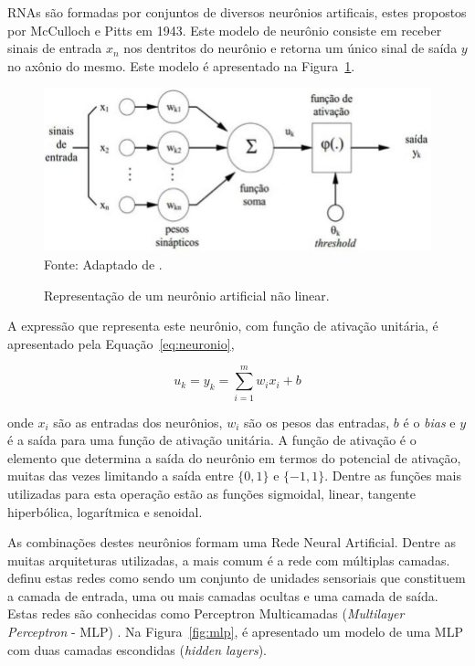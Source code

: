RNAs são formadas por conjuntos de diversos neurônios artificais, estes propostos por McCulloch e Pitts em 1943. Este modelo de neurônio consiste em receber sinais de entrada $x_n$ nos dentritos do neurônio e retorna um único sinal de saída $y$ no axônio do mesmo. Este modelo é apresentado na Figura~\ref{fig:neuronio-artificial}.

\begin{figure}[!htb]
	\centering
	\caption{Representação de um neurônio artificial não linear.}
	\includegraphics[width=0.6\linewidth]{neuronio-artificial.jpg}\\
	{\small Fonte: Adaptado de .}
	\label{fig:neuronio-artificial}
\end{figure}

A expressão que representa este neurônio, com função de ativação unitária, é apresentado pela Equação~\ref{eq:neuronio},

\begin{equation}
	u_k = y_k = \sum _{i=1}^{m}{w}_{i}{x}_{i}+b
	\label{eq:neuronio}
\end{equation}

\noindent onde $x_i$ são as entradas dos neurônios, $w_i$ são os pesos das entradas, $b$ é o \textit{bias} e $y$ é a saída para uma função de ativação unitária. A função de ativação é o elemento que determina  a saída do neurônio em termos do potencial de ativação, muitas das vezes limitando a saída entre $\{0, 1\}$ e $\{-1, 1\}$. Dentre as funções mais utilizadas para esta operação estão as funções sigmoidal, linear, tangente hiperbólica, logarítmica e senoidal.

As combinações destes neurônios formam uma Rede Neural Artificial. Dentre as muitas arquiteturas utilizadas, a mais comum é a rede com múltiplas camadas.  definu estas redes como sendo um conjunto de unidades sensoriais que constituem a camada de entrada, uma ou mais camadas ocultas e uma camada de saída. Estas redes são conhecidas como Perceptron Multicamadas (\textit{Multilayer Perceptron} - MLP) \cite{rosenblatt1962principles}. Na Figura~\ref{fig:mlp}, é apresentado um modelo de uma MLP com duas camadas escondidas (\textit{hidden layers}).


